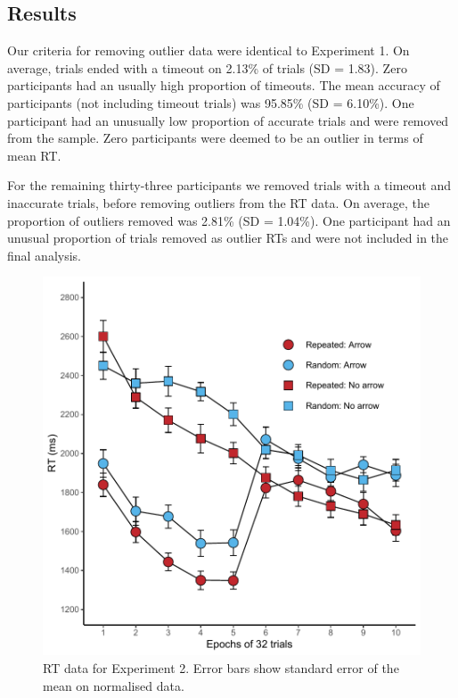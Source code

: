 \documentclass[
  man,floatsintext]{apa7}
\begin{document}
\hypertarget{results-1}{%
\subsection{Results}\label{results-1}}

Our criteria for removing outlier data were identical to Experiment 1. On average, trials ended with a timeout on 2.13\% of trials (SD = 1.83). Zero participants had an usually high proportion of timeouts. The mean accuracy of participants (not including timeout trials) was 95.85\% (SD = 6.10\%). One participant had an unusually low proportion of accurate trials and were removed from the sample. Zero participants were deemed to be an outlier in terms of mean RT.

For the remaining thirty-three participants we removed trials with a timeout and inaccurate trials, before removing outliers from the RT data. On average, the proportion of outliers removed was 2.81\% (SD = 1.04\%). One participant had an unusual proportion of trials removed as outlier RTs and were not included in the final analysis.

\begin{figure}

{\centering \includegraphics{CCC_ms1_files/figure-latex/Exp2-RT-figure-1} 

}

\caption{RT data for Experiment 2. Error bars show standard error of the mean on normalised data.}\label{fig:Exp2-RT-figure}
\end{figure}
\end{document}
